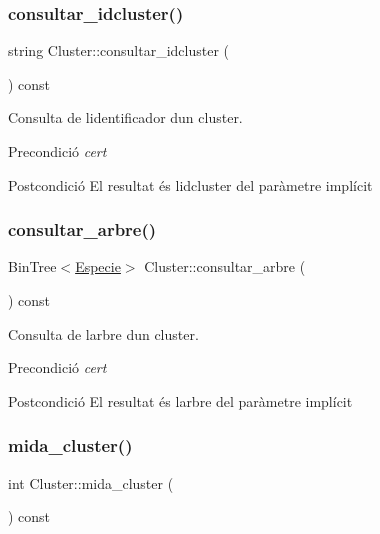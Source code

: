 \subsubsection{\texorpdfstring{consultar\+\_\+idcluster()}{consultar\_idcluster()}}
{\footnotesize\ttfamily string Cluster\+::consultar\+\_\+idcluster (\begin{DoxyParamCaption}{ }\end{DoxyParamCaption}) const}



Consulta de l\textquotesingle{}identificador d\textquotesingle{}un cluster. 

\begin{DoxyPrecond}{Precondició}
{\itshape cert} 
\end{DoxyPrecond}
\begin{DoxyPostcond}{Postcondició}
El resultat és l\textquotesingle{}idcluster del paràmetre implícit 
\end{DoxyPostcond}
\mbox{\label{class_cluster_a0fdd12bda86041ea38bd761adb90f72b}} 
\subsubsection{\texorpdfstring{consultar\+\_\+arbre()}{consultar\_arbre()}}
{\footnotesize\ttfamily Bin\+Tree$<$\hyperlink{class_especie}{Especie}$>$ Cluster\+::consultar\+\_\+arbre (\begin{DoxyParamCaption}{ }\end{DoxyParamCaption}) const}



Consulta de l\textquotesingle{}arbre d\textquotesingle{}un cluster. 

\begin{DoxyPrecond}{Precondició}
{\itshape cert} 
\end{DoxyPrecond}
\begin{DoxyPostcond}{Postcondició}
El resultat és l\textquotesingle{}arbre del paràmetre implícit 
\end{DoxyPostcond}
\mbox{\label{class_cluster_a4c8575921b44eae850575e1b199364f8}} 
\subsubsection{\texorpdfstring{mida\+\_\+cluster()}{mida\_cluster()}}
{\footnotesize\ttfamily int Cluster\+::mida\+\_\+cluster (\begin{DoxyParamCaption}{ }\end{DoxyParamCaption}) const}




